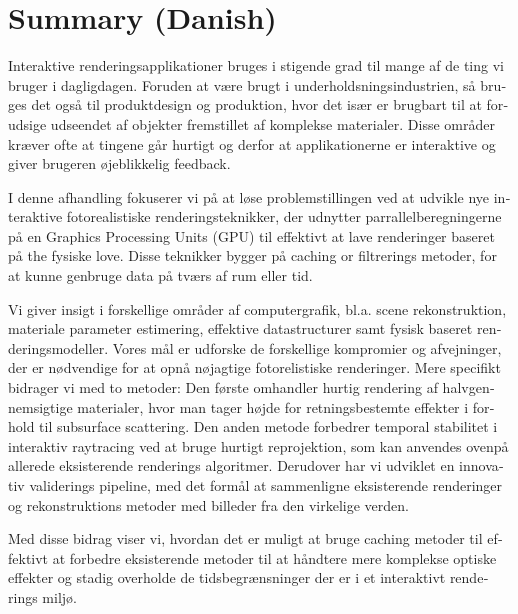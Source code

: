 \chapter{Summary (Danish)}
\begin{otherlanguage}{danish}
Interaktive renderingsapplikationer bruges i stigende grad til mange af de ting vi bruger i dagligdagen. Foruden at være brugt i underholdsningsindustrien, så bruges det også til produktdesign og produktion, hvor det især er brugbart til at forudsige udseendet af objekter fremstillet af komplekse materialer. Disse områder kræver ofte at tingene går hurtigt og derfor at applikationerne er interaktive og giver brugeren øjeblikkelig feedback. 

I denne afhandling fokuserer vi på at løse problemstillingen ved at udvikle nye interaktive fotorealistiske renderingsteknikker, der udnytter parrallelberegningerne på en Graphics Processing Units (GPU) til effektivt at lave renderinger baseret på the fysiske love. Disse teknikker bygger på caching or filtrerings metoder, for at kunne genbruge data på tværs af rum eller tid. 

Vi giver insigt i forskellige områder af computergrafik, bl.a. scene rekonstruktion, materiale parameter estimering, effektive datastructurer samt fysisk baseret renderingsmodeller. Vores mål er udforske de forskellige kompromier og afvejninger, der er nødvendige for at opnå nøjagtige fotorelistiske renderinger. Mere specifikt bidrager vi med to metoder: Den første omhandler hurtig rendering af halvgennemsigtige materialer, hvor man tager højde for retningsbestemte effekter i forhold til subsurface scattering. Den anden metode forbedrer temporal stabilitet i interaktiv raytracing ved at bruge hurtigt reprojektion, som kan anvendes ovenpå allerede eksisterende renderings algoritmer. Derudover har vi udviklet en innovativ validerings pipeline, med det formål at sammenligne eksisterende renderinger og rekonstruktions metoder med billeder fra den virkelige verden. 

Med disse bidrag viser vi, hvordan det er muligt at bruge caching metoder til effektivt at forbedre eksisterende metoder til at håndtere mere komplekse optiske effekter og stadig overholde de tidsbegrænsninger der er i et interaktivt renderings miljø.
\end{otherlanguage}